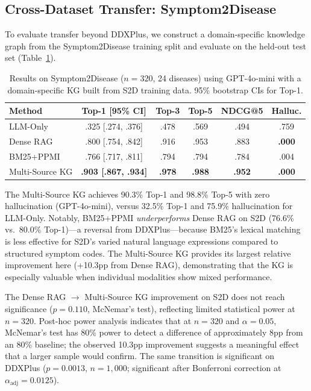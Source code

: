 \documentclass[runningheads]{llncs}
\begin{document}
\subsection{Cross-Dataset Transfer: Symptom2Disease}
\label{sec:cross_domain}

To evaluate transfer beyond DDXPlus, we construct a domain-specific knowledge graph from the Symptom2Disease training split and evaluate on the held-out test set (Table~\ref{tab:s2d}).

\begin{table}[t]
\centering
\caption{Results on Symptom2Disease ($n{=}320$, 24 diseases) using GPT-4o-mini with a domain-specific KG built from S2D training data. 95\% bootstrap CIs for Top-1.}
\label{tab:s2d}
\begin{tabular}{lccccc}
\toprule
\textbf{Method} & \textbf{Top-1 [95\% CI]} & \textbf{Top-3} & \textbf{Top-5} & \textbf{NDCG@5} & \textbf{Halluc.} \\
\midrule
LLM-Only       & .325 [.274, .376] & .478 & .569 & .494 & .759 \\
Dense RAG       & .800 [.754, .842] & .916 & .953 & .883 & \textbf{.000} \\
BM25+PPMI       & .766 [.717, .811] & .794 & .794 & .784 & .004 \\
Multi-Source KG & \textbf{.903 [.867, .934]} & \textbf{.978} & \textbf{.988} & \textbf{.952} & \textbf{.000} \\
\bottomrule
\end{tabular}
\end{table}

The Multi-Source KG achieves 90.3\% Top-1 and 98.8\% Top-5 with zero hallucination (GPT-4o-mini), versus 32.5\% Top-1 and 75.9\% hallucination for LLM-Only. Notably, BM25+PPMI \emph{underperforms} Dense RAG on S2D (76.6\% vs.\ 80.0\% Top-1)---a reversal from DDXPlus---because BM25's lexical matching is less effective for S2D's varied natural language expressions compared to structured symptom codes. The Multi-Source KG provides its largest relative improvement here (+10.3pp from Dense RAG), demonstrating that the KG is especially valuable when individual modalities show mixed performance.

The Dense RAG $\rightarrow$ Multi-Source KG improvement on S2D does not reach significance ($p{=}0.110$, McNemar's test), reflecting limited statistical power at $n{=}320$. Post-hoc power analysis indicates that at $n{=}320$ and $\alpha{=}0.05$, McNemar's test has 80\% power to detect a difference of approximately 8pp from an 80\% baseline; the observed 10.3pp improvement suggests a meaningful effect that a larger sample would confirm. The same transition is significant on DDXPlus ($p{=}0.0013$, $n{=}1{,}000$; significant after Bonferroni correction at $\alpha_{\text{adj}}{=}0.0125$).
\end{document}
